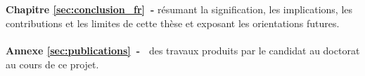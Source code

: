 \\
\\
\textbf{Chapitre \ref{sec:conclusion_fr}~-} résumant la signification, les implications, les contributions et les limites de cette thèse et exposant les orientations futures.
\\
\\
\textbf{Annexe \ref{sec:publications}~-~} des travaux produits par le candidat au doctorat au cours de ce projet.